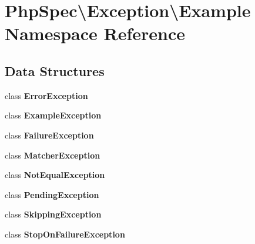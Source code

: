 \section{Php\+Spec\textbackslash{}Exception\textbackslash{}Example Namespace Reference}
\label{namespace_php_spec_1_1_exception_1_1_example}
\subsection*{Data Structures}
\begin{DoxyCompactItemize}
\item 
class {\bf Error\+Exception}
\item 
class {\bf Example\+Exception}
\item 
class {\bf Failure\+Exception}
\item 
class {\bf Matcher\+Exception}
\item 
class {\bf Not\+Equal\+Exception}
\item 
class {\bf Pending\+Exception}
\item 
class {\bf Skipping\+Exception}
\item 
class {\bf Stop\+On\+Failure\+Exception}
\end{DoxyCompactItemize}
